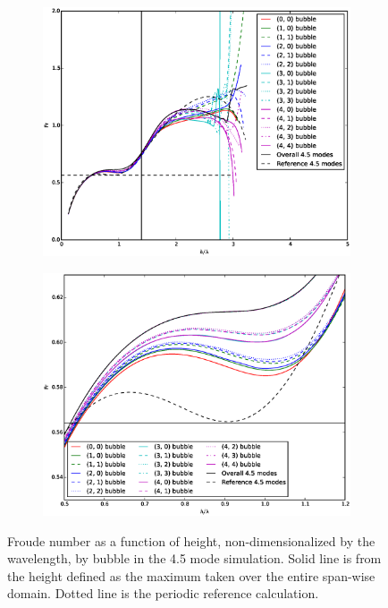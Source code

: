 \begin{figure}
\begin{subfigure}[b]{\columnwidth}
  \includegraphics[width=\columnwidth]{plts/walls_Fr}
\end{subfigure}
\begin{subfigure}[b]{\columnwidth}
  \includegraphics[width=\columnwidth]{plts/walls_Fr_zoom}
\end{subfigure}
\caption{  
Froude number as a function of height, non-dimensionalized by the wavelength, by bubble in the 4.5 mode simulation.
Solid line is from the height defined as the maximum taken over the entire span-wise domain.
Dotted line is the periodic reference calculation.
}
\end{figure}

